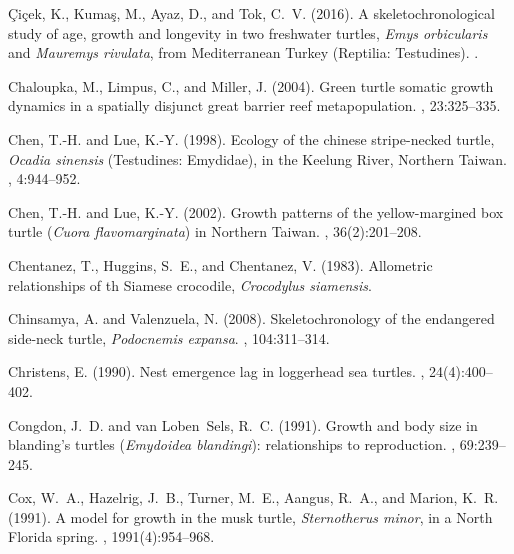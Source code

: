 \documentclass{article}
\begin{document}
\begin{thebibliography}{}
\c{C}i\c{c}ek, K., Kuma\c{s}, M., Ayaz, D., and Tok, C.~V. (2016).
\newblock A skeletochronological study of age, growth and longevity in two
  freshwater turtles, \emph{Emys orbicularis} and \emph{Mauremys rivulata},
  from {M}editerranean {T}urkey ({R}eptilia: {T}estudines).
.

Chaloupka, M., Limpus, C., and Miller, J. (2004).
\newblock Green turtle somatic growth dynamics in a spatially disjunct great
  barrier reef metapopulation.
, 23:325--335.

Chen, T.-H. and Lue, K.-Y. (1998).
\newblock Ecology of the chinese stripe-necked turtle, \emph{Ocadia sinensis}
  ({T}estudines: {E}mydidae), in the {K}eelung {R}iver, {N}orthern {T}aiwan.
, 4:944--952.

Chen, T.-H. and Lue, K.-Y. (2002).
\newblock Growth patterns of the yellow-margined box turtle (\emph{Cuora
  flavomarginata}) in {N}orthern {T}aiwan.
, 36(2):201--208.

Chentanez, T., Huggins, S.~E., and Chentanez, V. (1983).
\newblock Allometric relationships of th {S}iamese crocodile, \emph{Crocodylus
  siamensis}.

Chinsamya, A. and Valenzuela, N. (2008).
\newblock Skeletochronology of the endangered side-neck turtle,
  \emph{Podocnemis expansa}.
, 104:311--314.

Christens, E. (1990).
\newblock Nest emergence lag in loggerhead sea turtles.
, 24(4):400--402.

Congdon, J.~D. and van Loben~Sels, R.~C. (1991).
\newblock Growth and body size in blanding's turtles (\emph{Emydoidea
  blandingi}): relationships to reproduction.
, 69:239--245.

Cox, W.~A., Hazelrig, J.~B., Turner, M.~E., Aangus, R.~A., and Marion, K.~R.
  (1991).
\newblock A model for growth in the musk turtle, \emph{Sternotherus minor}, in
  a {N}orth {F}lorida spring.
, 1991(4):954--968.


\end{thebibliography}
\end{document}
